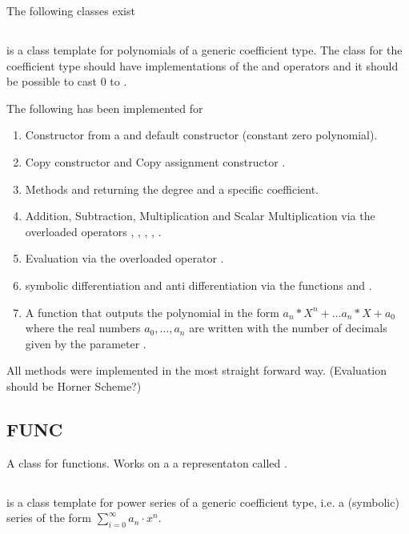 		The following classes exist
		
		\subsection{\poly} 
			\textbf{} is a class template for polynomials of a generic coefficient type. 
			The class for the coefficient type should have implementations of the \code{*} and \code{+} operators
			and it should be possible to cast $0$ to .

			The following has been implemented for \poly
			\begin{enumerate}
				\item Constructor from a  and default constructor (constant zero polynomial).
				\item Copy constructor  and Copy assignment constructor .
				\item Methods  and  returning the degree and a specific coefficient.
				\item Addition, Subtraction, Multiplication and Scalar Multiplication via the overloaded operators \code{+}, \code{-}, 	\code{*}, \code{+=}, \code{*=}.
				\item Evaluation via the overloaded operator \code{()}.
				\item symbolic differentiation and anti differentiation via the functions  and .
				\item A function  that outputs the polynomial
				in the form $a_n*X^n+ \dots a_n*X + a_0$ where the real numbers $a_0, \dots, a_n$ are written with the number of decimals given by the parameter .
			\end{enumerate}
			All methods were implemented in the most straight forward way. (Evaluation should be Horner Scheme?)
		\subsection{FUNC}
			\textbf{\func} A class for functions. 
			Works on a a representaton called .
		\subsection{\powerseries}
			\textbf{} is a class template for power series of a generic coefficient type, 
			i.e. a (symbolic) series of the form $ \sum_{i=0}^\infty a_n \cdot x^n$.

